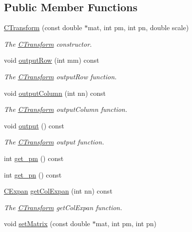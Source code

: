 \subsection*{Public Member Functions}
\begin{DoxyCompactItemize}
\item 
\hyperlink{classCTransform_aaca4e7da74c5e112f0668574f59b142c}{C\-Transform} (const double $\ast$mat, int pm, int pn, double scale)
\begin{DoxyCompactList}\small\item\em The \hyperlink{classCTransform}{C\-Transform} constructor. \end{DoxyCompactList}\item 
void \hyperlink{classCTransform_adf0193b42b9f1795f8a17fceefbfa427}{output\-Row} (int mm) const 
\begin{DoxyCompactList}\small\item\em The \hyperlink{classCTransform}{C\-Transform} output\-Row function. \end{DoxyCompactList}\item 
void \hyperlink{classCTransform_a01467c37d6e3398be562c74516a1290e}{output\-Column} (int nn) const 
\begin{DoxyCompactList}\small\item\em The \hyperlink{classCTransform}{C\-Transform} output\-Column function. \end{DoxyCompactList}\item 
void \hyperlink{classCTransform_a33b3e751b4e0704a25c1b1086dbcaed5}{output} () const 
\begin{DoxyCompactList}\small\item\em The \hyperlink{classCTransform}{C\-Transform} output function. \end{DoxyCompactList}\item 
int \hyperlink{classCTransform_a8bd382c6cd79bb036f63d3469e5c586e}{get\-\_\-pm} () const 
\item 
int \hyperlink{classCTransform_a0c82963d5c30d77d66e9d4c46851e80f}{get\-\_\-pn} () const 
\item 
\hyperlink{classCExpan}{C\-Expan} \hyperlink{classCTransform_ae78cdbedd47c2f795f5ae43dd3f47bb4}{get\-Col\-Expan} (int nn) const 
\begin{DoxyCompactList}\small\item\em The \hyperlink{classCTransform}{C\-Transform} get\-Col\-Expan function. \end{DoxyCompactList}\item 
void \hyperlink{classCTransform_ad2787bd2e2007722952cc766047ad850}{set\-Matrix} (const double $\ast$mat, int pm, int pn)

\end{DoxyCompactItemize}
